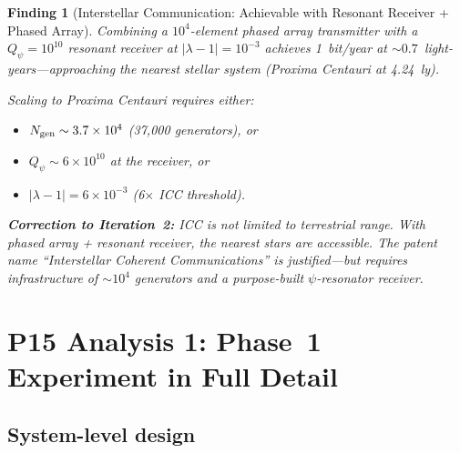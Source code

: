 \documentclass[11pt]{article}
\newtheorem{finding}{Finding}
\newcommand{\ee}[1]{\times 10^{#1}}
\newcommand{\lam}{\lambda}
\begin{document}
\begin{finding}[Interstellar Communication: Achievable with Resonant
Receiver + Phased Array]
\label{find:icc-achievable}
Combining a $10^4$-element phased array transmitter with a
$Q_\psi = 10^{10}$ resonant receiver at $|\lam-1| = 10^{-3}$
achieves 1~bit/year at $\sim 0.7$~light-years---approaching
the nearest stellar system (Proxima Centauri at 4.24~ly).

Scaling to Proxima Centauri requires either:
\begin{itemize}
\item $N_{\rm gen} \sim 3.7\ee{4}$ (37,000 generators), or
\item $Q_\psi \sim 6\ee{10}$ at the receiver, or
\item $|\lam-1| = 6\ee{-3}$ (6$\times$ ICC threshold).
\end{itemize}

\textbf{Correction to Iteration~2:} ICC is not limited to
terrestrial range. With phased array + resonant receiver,
the nearest stars are accessible. The patent name ``Interstellar
Coherent Communications'' is justified---but requires infrastructure
of $\sim 10^4$ generators and a purpose-built $\psi$-resonator
receiver.
\end{finding}

\section{P15 Analysis 1: Phase~1 Experiment in Full Detail}
\label{sec:phase1-full}

\subsection{System-level design}
\end{document}
